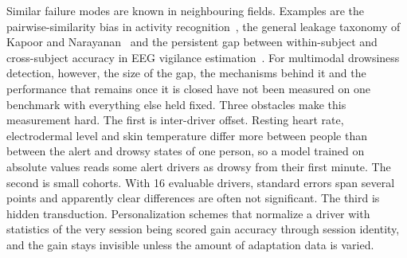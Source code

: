 \documentclass[journal]{IEEEtran}
\begin{document}
Similar failure modes are known in neighbouring fields. Examples are the
pairwise-similarity bias in activity recognition~\cite{hammerla2015stick},
the general leakage taxonomy of Kapoor and Narayanan~\cite{kapoor2023leakage}
and the persistent gap between within-subject and cross-subject accuracy in
EEG vigilance estimation~\cite{cui2022compact,shen2021subject}. For
multimodal drowsiness detection, however, the size of the gap, the mechanisms
behind it and the performance that remains once it is closed have not been
measured on one benchmark with everything else held fixed. Three obstacles
make this measurement hard. The first is inter-driver offset. Resting heart
rate, electrodermal level and skin temperature differ more between people than
between the alert and drowsy states of one person, so a model trained on
absolute values reads some alert drivers as drowsy from their first minute.
The second is small cohorts. With 16 evaluable drivers, standard errors span
several points and apparently clear differences are often not significant.
The third is hidden transduction. Personalization schemes that normalize a
driver with statistics of the very session being scored gain accuracy through
session identity, and the gain stays invisible unless the amount of adaptation
data is varied.
\end{document}
